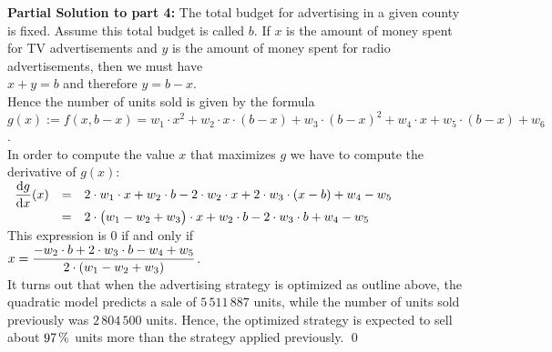 \noindent
\textbf{Partial Solution to part 4:}  
The total budget for advertising in a given county is fixed.  Assume
this total budget is called $b$.  If $x$ is the amount of money spent for TV advertisements and $y$ is the
amount of money spent for radio advertisements, then we must have
\\[0.2cm]
\hspace*{1.3cm}
$x + y = b$ \quad and therefore \quad $y = b - x$.
\\[0.2cm]
Hence the number of units sold is given by the formula
\\[0.2cm]
\hspace*{1.3cm}
$g(x) := f(x, b - x) = w_1 \cdot x^2 + w_2 \cdot x \cdot (b - x) + w_3 \cdot (b - x)^2 + w_4 \cdot x + w_5 \cdot (b - x) + w_6$.
\\[0.2cm]
In order to compute the value $x$ that maximizes $g$ we have to compute the derivative of $g(x)$:
\\[0.2cm]
\hspace*{1.3cm}
$
\begin{array}[t]{lcl}
\displaystyle \frac{\mathrm{d} g}{\mathrm{d}x}(x) 
& = & 2 \cdot w_1 \cdot x + w_2 \cdot b - 2 \cdot w_2 \cdot x + 2 \cdot w_3 \cdot (x - b) + w_4 - w_5 \\[0.2cm]
& = & 2 \cdot \bigl(w_1 - w_2 + w_3\bigr) \cdot x + w_2 \cdot b - 2 \cdot w_3 \cdot b + w_4 - w_5  
\end{array}
$
\\[0.2cm]
This expression is $0$ if and only if
\\[0.2cm]
\hspace*{1.3cm}
$\displaystyle x = \frac{- w_2 \cdot b + 2 \cdot w_3 \cdot b - w_4 + w_5}{2 \cdot (w_1 - w_2 + w_3)}$.
\\[0.2cm]
It turns out that when the advertising strategy is optimized as outline above,  the quadratic model predicts a
sale of $5\,511\,887$ units, while the number of units sold previously was $2\,804\,500$ units.  Hence, the
optimized strategy is expected to sell about $97\,\mathtt{\symbol{37}}$ units more than the strategy applied previously. 
\qed




